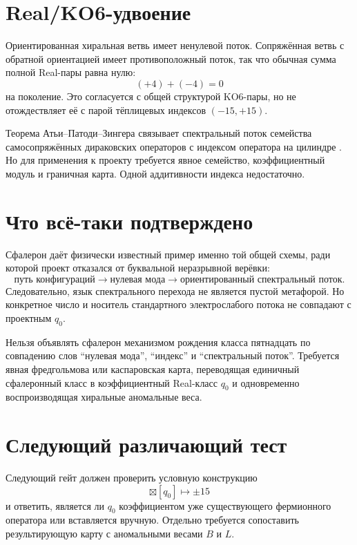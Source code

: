 \section{Real/KO6-удвоение}

Ориентированная хиральная ветвь имеет ненулевой поток. Сопряжённая ветвь
с обратной ориентацией имеет противоположный поток, так что обычная сумма
полной Real-пары равна нулю:
\begin{equation}
 (+4)+(-4)=0
\end{equation}
на поколение. Это согласуется с общей структурой KO6-пары, но не
отождествляет её с парой тёплицевых индексов $(-15,+15)$.

Теорема Атьи--Патоди--Зингера связывает спектральный поток семейства
самосопряжённых дираковских операторов с индексом оператора на цилиндре
\cite{sphaleron-flow-aps1975}. Но для применения к проекту требуется
явное семейство, коэффициентный модуль и граничная карта. Одной
аддитивности индекса недостаточно.

\section{Что всё-таки подтверждено}

Сфалерон даёт физически известный пример именно той общей схемы, ради
которой проект отказался от буквальной неразрывной верёвки:
\begin{equation}
 \text{путь конфигураций}
 \longrightarrow
 \text{нулевая мода}
 \longrightarrow
 \text{ориентированный спектральный поток}.
\end{equation}
Следовательно, язык спектрального перехода не является пустой метафорой.
Но конкретное число и носитель стандартного электрослабого потока не
совпадают с проектным $q_0$.

\begin{nogocriterion}
Нельзя объявлять сфалерон механизмом рождения класса пятнадцать по
совпадению слов ``нулевая мода'', ``индекс'' и ``спектральный поток''.
Требуется явная фредгольмова или каспаровская карта, переводящая единичный
сфалеронный класс в коэффициентный Real-класс $q_0$ и одновременно
воспроизводящая хиральные аномальные веса.
\end{nogocriterion}

\section{Следующий различающий тест}

Следующий гейт
должен проверить условную конструкцию
\begin{equation}
 [\text{sphaleron path}]\boxtimes[q_0]
 \longmapsto \pm15
\end{equation}
и ответить, является ли $q_0$ коэффициентом уже существующего
фермионного оператора или вставляется вручную. Отдельно требуется
сопоставить результирующую карту с аномальными весами $B$ и $L$.

